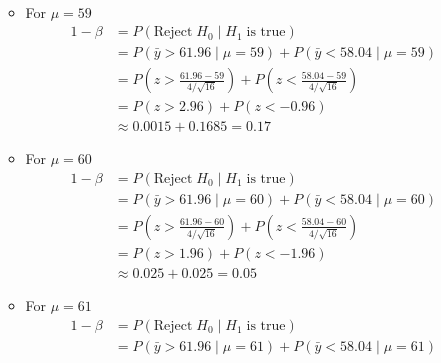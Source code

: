 \documentclass{uofa-eng-assignment}
\begin{document}
\begin{enumerate}
\begin{itemize}
\begin{align*}
                  \end{align*}
            \item For $\mu = 59$
                  \begin{align*}
                      1 - \beta & = P(\text{Reject}\;H_0\;|\;H_1\;\text{is true})                                                      \\
                                & = P(\bar{y} > 61.96\;|\;\mu = 59) + P(\bar{y} < 58.04\;|\;\mu = 59)                                  \\
                                & = P(z > \frac{61.96 - 59}{4 / \sqrt{16}}) + P(z <\frac{58.04 - 59}{4 / \sqrt{16}})                   \\
                                & = P(z > 2.96) +  P(z < -0.96)                                                                        \\
                                & \approx 0.0015 + 0.1685                                                                       = 0.17
                  \end{align*}
            \item For $\mu = 60$
                  \begin{align*}
                      1 - \beta & = P(\text{Reject}\;H_0\;|\;H_1\;\text{is true})                                                    \\
                                & = P(\bar{y} > 61.96\;|\;\mu = 60) + P(\bar{y} < 58.04\;|\;\mu = 60)                                \\
                                & = P(z > \frac{61.96 - 60}{4 / \sqrt{16}}) + P(z <\frac{58.04 - 60}{4 / \sqrt{16}})                 \\
                                & = P(z > 1.96) +  P(z < -1.96)                                                                      \\
                                & \approx 0.025 + 0.025                                                                       = 0.05
                  \end{align*}
            \item For $\mu = 61$
                  \begin{align*}
                      1 - \beta & = P(\text{Reject}\;H_0\;|\;H_1\;\text{is true})                                                      \\
                                & = P(\bar{y} > 61.96\;|\;\mu = 61) + P(\bar{y} < 58.04\;|\;\mu = 61)                                  \\

\end{align*}
\end{itemize}
\end{enumerate}
\end{document}

